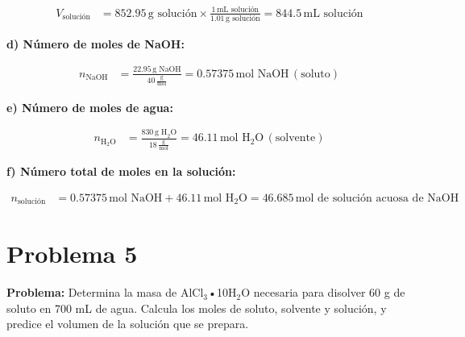\documentclass{article}
\begin{document}
\begin{align*}
    V_{\text{solución}} &= 852.95 \, \text{g solución} \times \frac{1 \, \text{mL solución}}{1.01 \, \text{g solución}} = 844.5 \, \text{mL solución}
\end{align*}

\textbf{d) Número de moles de NaOH:}

\begin{align*}
    n_{\text{NaOH}} &= \frac{22.95 \, \text{g NaOH}}{40 \, \frac{\text{g}}{\text{mol}}} = 0.57375 \, \text{mol NaOH} \, (\text{soluto})
\end{align*}

\textbf{e) Número de moles de agua:}

\begin{align*}
    n_{\text{H}_2\text{O}} &= \frac{830 \, \text{g H}_2\text{O}}{18 \, \frac{\text{g}}{\text{mol}}} = 46.11 \, \text{mol H}_2\text{O} \, (\text{solvente})
\end{align*}

\textbf{f) Número total de moles en la solución:}

\begin{align*}
    n_{\text{solución}} &= 0.57375 \, \text{mol NaOH} + 46.11 \, \text{mol H}_2\text{O} = 46.685 \, \text{mol de solución acuosa de NaOH}
\end{align*}










\newpage
\section*{Problema 5}
\textbf{Problema:}
Determina la masa de AlCl$_3$•10H$_2$O necesaria para disolver 60 g de soluto en 700 mL de agua. Calcula los moles de soluto, solvente y solución, y predice el volumen de la solución que se prepara.
\end{document}
